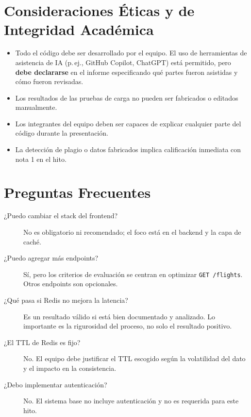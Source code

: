 \documentclass[12pt,a4paper]{article}
\begin{document}
\section{Consideraciones Éticas y de Integridad Académica}

\begin{itemize}
  \item Todo el código debe ser desarrollado por el equipo. El uso de herramientas de asistencia de IA (p.\,ej., GitHub Copilot, ChatGPT) está permitido, pero \textbf{debe declararse} en el informe especificando qué partes fueron asistidas y cómo fueron revisadas.
  \item Los resultados de las pruebas de carga no pueden ser fabricados o editados manualmente.
  \item Los integrantes del equipo deben ser capaces de explicar cualquier parte del código durante la presentación.
  \item La detección de plagio o datos fabricados implica calificación inmediata con nota 1 en el hito.
\end{itemize}

\section{Preguntas Frecuentes}

\begin{description}
  \item[¿Puedo cambiar el stack del frontend?] No es obligatorio ni recomendado; el foco está en el backend y la capa de caché.

  \item[¿Puedo agregar más endpoints?] Sí, pero los criterios de evaluación se centran en optimizar \texttt{GET /flights}. Otros endpoints son opcionales.

  \item[¿Qué pasa si Redis no mejora la latencia?] Es un resultado válido si está bien documentado y analizado. Lo importante es la rigurosidad del proceso, no solo el resultado positivo.

  \item[¿El TTL de Redis es fijo?] No. El equipo debe justificar el TTL escogido según la volatilidad del dato y el impacto en la consistencia.

  \item[¿Debo implementar autenticación?] No. El sistema base no incluye autenticación y no es requerida para este hito.
\end{description}
\end{document}
